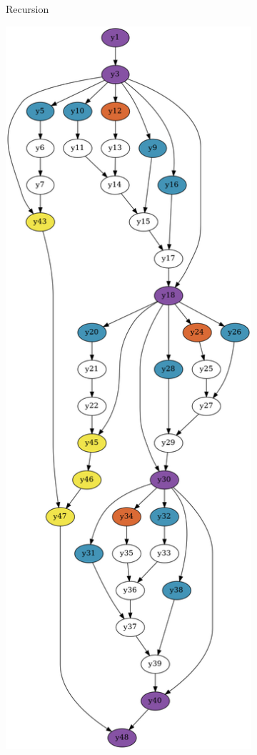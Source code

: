 \documentclass[../diploma.tex]{subfiles}
\begin{document}
\begin{figure}[htbp]
\begin{adjustwidth}{-2cm}{-2cm}
\begin{subfigure}{0.28\textwidth}
    \caption{Recursion}
    \end{subfigure}
    \captionsetup{justification = centering,
    singlelinecheck = false}
    \begin{subfigure}{0.28\textwidth}
      \centering
    \includegraphics[width=\textwidth]{graph_if2.png}

\end{subfigure}
\end{adjustwidth}
\end{figure}
\end{document}
